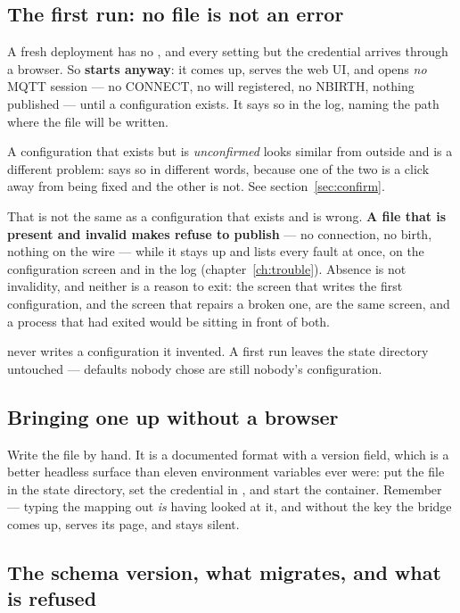 \subsection{The first run: no file is not an error}

A fresh deployment has no , and every setting but the credential arrives
through a browser. So \prog \textbf{starts anyway}: it comes up, serves the web UI, and
opens \emph{no} MQTT session --- no CONNECT, no will registered, no NBIRTH, nothing
published --- until a configuration exists. It says so in the log, naming the path where
the file will be written.

A configuration that exists but is \emph{unconfirmed} looks similar from outside and is a different
problem: \prog says so in different words, because one of the two is a click away from being fixed
and the other is not. See section~\ref{sec:confirm}.

That is not the same as a configuration that exists and is wrong. \textbf{A file that is
present and invalid makes \prog refuse to publish} --- no connection, no birth, nothing on
the wire --- while it stays up and lists every fault at once, on the configuration screen and
in the log (chapter~\ref{ch:trouble}). Absence is not invalidity, and neither is a reason to
exit: the screen that writes the first configuration, and the screen that repairs a broken
one, are the same screen, and a process that had exited would be sitting in front of both.

\prog never writes a configuration it invented. A first run leaves the state directory
untouched --- defaults nobody chose are still nobody's configuration.

\subsection{Bringing one up without a browser}
\label{sec:headless}

Write the file by hand. It is a documented format with a version field, which is a better
headless surface than eleven environment variables ever were: put the file in the state
directory, set the credential in , and start the container. Remember
 --- typing the mapping out \emph{is} having looked at it,
and without the key the bridge comes up, serves its page, and stays silent.

\subsection{The schema version, what migrates, and what is refused}

